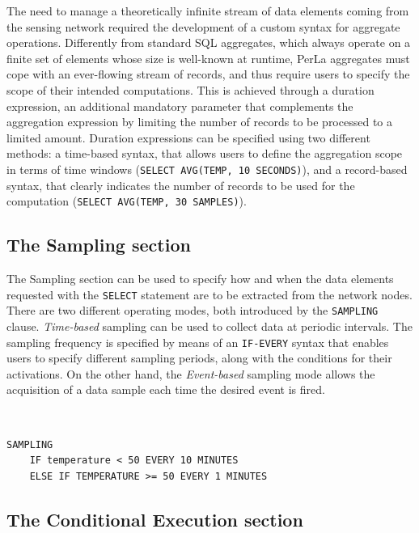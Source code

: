 The need to manage a theoretically infinite stream of data elements coming from
the sensing network required the development of a custom syntax for aggregate
operations. Differently from standard SQL aggregates, which always operate on a
finite set of elements whose size is well-known at runtime, PerLa aggregates
must cope with an ever-flowing stream of records, and thus require users to
specify the scope of their intended computations. This is achieved through a
duration expression, an additional mandatory parameter that complements the
aggregation expression by limiting the number of records to be processed to a
limited amount. Duration expressions can be specified using two different
methods: a time-based syntax, that allows users to define the aggregation scope
in terms of time windows (\lstinline!SELECT AVG(TEMP, 10 SECONDS)!), and a
record-based syntax, that clearly indicates the number of records to be used
for the computation (\lstinline!SELECT AVG(TEMP, 30 SAMPLES)!).

\subsection{The Sampling section}

The Sampling section can be used to specify how and when the data elements
requested with the \texttt{SELECT} statement are to be extracted from the
network nodes. There are two different operating modes, both introduced by the
\texttt{SAMPLING} clause. \textit{Time-based} sampling can be used to collect
data at periodic intervals. The sampling frequency is specified by means of an
\texttt{IF-EVERY} syntax that enables users to specify different sampling
periods, along with the conditions for their activations. On the other hand,
the \textit{Event-based} sampling mode allows the acquisition of a data sample
each time the desired event is fired.

~\\
\begin{lstlisting}[caption={An example of time-based sampling, which shows how
the sampling frequency can be increased as the monitored phenomenon evolves.}]
SAMPLING
    IF temperature < 50 EVERY 10 MINUTES
    ELSE IF TEMPERATURE >= 50 EVERY 1 MINUTES
\end{lstlisting}

\subsection{The Conditional Execution section}

